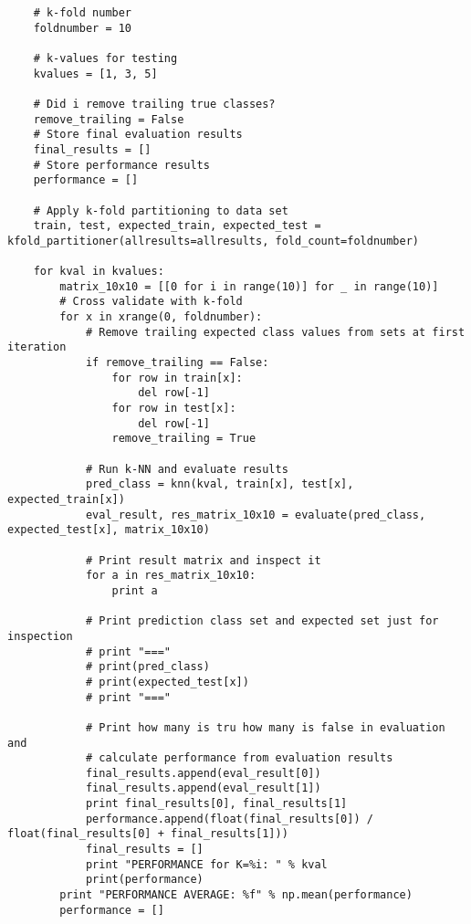 \documentclass[11pt]{article}
\begin{document}
\begin{enumerate}[\indent a)]
\begin{verbatim}
    # k-fold number
    foldnumber = 10

    # k-values for testing
    kvalues = [1, 3, 5]

    # Did i remove trailing true classes?
    remove_trailing = False
    # Store final evaluation results
    final_results = []
    # Store performance results
    performance = []

    # Apply k-fold partitioning to data set
    train, test, expected_train, expected_test = kfold_partitioner(allresults=allresults, fold_count=foldnumber)

    for kval in kvalues:
        matrix_10x10 = [[0 for i in range(10)] for _ in range(10)]
        # Cross validate with k-fold
        for x in xrange(0, foldnumber):
            # Remove trailing expected class values from sets at first iteration
            if remove_trailing == False:
                for row in train[x]:
                    del row[-1]
                for row in test[x]:
                    del row[-1]
                remove_trailing = True

            # Run k-NN and evaluate results
            pred_class = knn(kval, train[x], test[x], expected_train[x])
            eval_result, res_matrix_10x10 = evaluate(pred_class, expected_test[x], matrix_10x10)

            # Print result matrix and inspect it
            for a in res_matrix_10x10:
                print a

            # Print prediction class set and expected set just for inspection
            # print "==="
            # print(pred_class)
            # print(expected_test[x])
            # print "==="

            # Print how many is tru how many is false in evaluation and
            # calculate performance from evaluation results
            final_results.append(eval_result[0])
            final_results.append(eval_result[1])
            print final_results[0], final_results[1]
            performance.append(float(final_results[0]) / float(final_results[0] + final_results[1]))
            final_results = []
            print "PERFORMANCE for K=%i: " % kval
            print(performance)
        print "PERFORMANCE AVERAGE: %f" % np.mean(performance)
        performance = []
\end{verbatim}


\end{enumerate}
\end{document}
